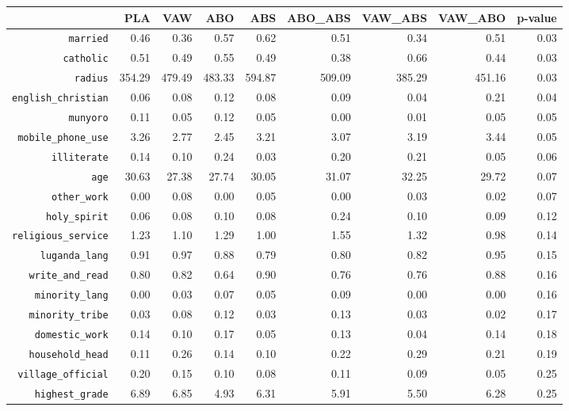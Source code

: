 \begin{longtable}{rrrrrrrrr}
  \hline
 & PLA & VAW & ABO & ABS & ABO\_ABS & VAW\_ABS & VAW\_ABO & p-value \\ 
  \hline
{\texttt{married}} & 0.46 & 0.36 & 0.57 & 0.62 & 0.51 & 0.34 & 0.51 & 0.03 \\ 
  {\texttt{catholic}} & 0.51 & 0.49 & 0.55 & 0.49 & 0.38 & 0.66 & 0.44 & 0.03 \\ 
  {\texttt{radius}} & 354.29 & 479.49 & 483.33 & 594.87 & 509.09 & 385.29 & 451.16 & 0.03 \\ 
  {\texttt{english\_christian}} & 0.06 & 0.08 & 0.12 & 0.08 & 0.09 & 0.04 & 0.21 & 0.04 \\ 
  {\texttt{munyoro}} & 0.11 & 0.05 & 0.12 & 0.05 & 0.00 & 0.01 & 0.05 & 0.05 \\ 
  {\texttt{mobile\_phone\_use}} & 3.26 & 2.77 & 2.45 & 3.21 & 3.07 & 3.19 & 3.44 & 0.05 \\ 
  {\texttt{illiterate}} & 0.14 & 0.10 & 0.24 & 0.03 & 0.20 & 0.21 & 0.05 & 0.06 \\ 
  {\texttt{age}} & 30.63 & 27.38 & 27.74 & 30.05 & 31.07 & 32.25 & 29.72 & 0.07 \\ 
  {\texttt{other\_work}} & 0.00 & 0.08 & 0.00 & 0.05 & 0.00 & 0.03 & 0.02 & 0.07 \\ 
  {\texttt{holy\_spirit}} & 0.06 & 0.08 & 0.10 & 0.08 & 0.24 & 0.10 & 0.09 & 0.12 \\ 
  {\texttt{religious\_service}} & 1.23 & 1.10 & 1.29 & 1.00 & 1.55 & 1.32 & 0.98 & 0.14 \\ 
  {\texttt{luganda\_lang}} & 0.91 & 0.97 & 0.88 & 0.79 & 0.80 & 0.82 & 0.95 & 0.15 \\ 
  {\texttt{write\_and\_read}} & 0.80 & 0.82 & 0.64 & 0.90 & 0.76 & 0.76 & 0.88 & 0.16 \\ 
  {\texttt{minority\_lang}} & 0.00 & 0.03 & 0.07 & 0.05 & 0.09 & 0.00 & 0.00 & 0.16 \\ 
  {\texttt{minority\_tribe}} & 0.03 & 0.08 & 0.12 & 0.03 & 0.13 & 0.03 & 0.02 & 0.17 \\ 
  {\texttt{domestic\_work}} & 0.14 & 0.10 & 0.17 & 0.05 & 0.13 & 0.04 & 0.14 & 0.18 \\ 
  {\texttt{household\_head}} & 0.11 & 0.26 & 0.14 & 0.10 & 0.22 & 0.29 & 0.21 & 0.19 \\ 
  {\texttt{village\_official}} & 0.20 & 0.15 & 0.10 & 0.08 & 0.11 & 0.09 & 0.05 & 0.25 \\ 
  {\texttt{highest\_grade}} & 6.89 & 6.85 & 4.93 & 6.31 & 5.91 & 5.50 & 6.28 & 0.25 \\ 

\end{longtable}
